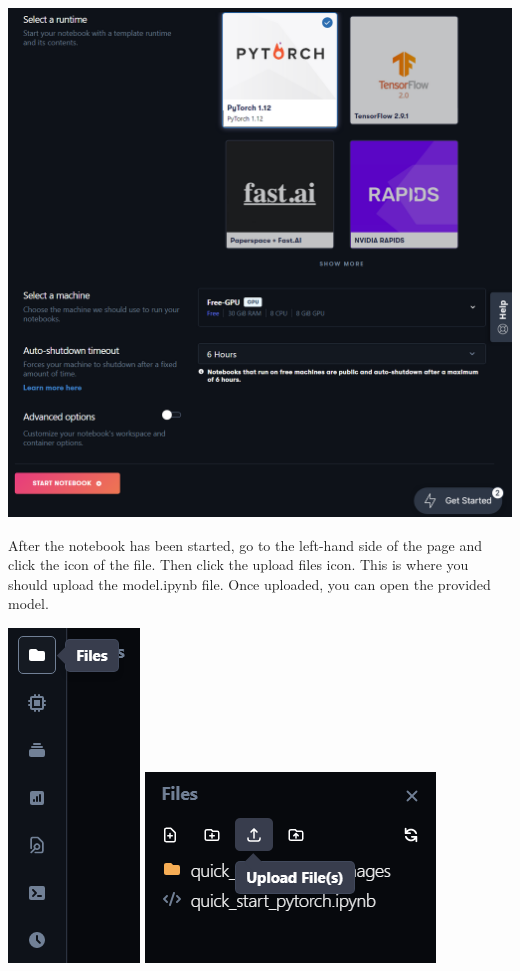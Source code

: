 \documentclass[11pt]{report}
\begin{document}
\begin{center}
    \includegraphics[scale=0.45]{settings.png}
\end{center}

After the notebook has been started, go to the left-hand side of the page and click the icon of the file. Then click the upload files icon. This is where you should upload the model.ipynb file. Once uploaded, you can open the provided model. 

\begin{center}
    \includegraphics[scale=0.7]{files.png}
    \includegraphics[scale=0.7]{uploadfiles.png}
\end{center}
\end{document}
